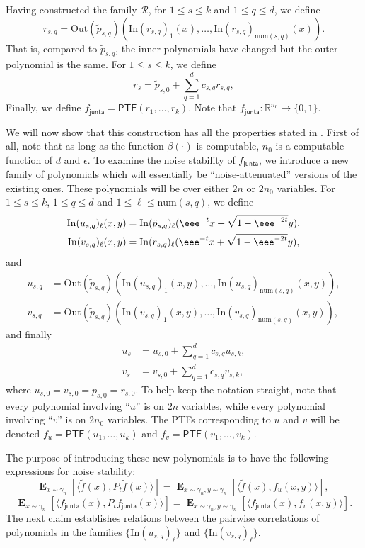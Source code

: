\documentclass{toc}
\newcommand{\Inner}{\mathrm{In}}
\newcommand{\Outer}{\mathrm{Out}}
\newcommand{\num}{\mathrm{num}}
\newcommand{\fh}{{f_{\mathsf{junta}}}}
\begin{document}
Having constructed the family $\mathcal{R}$, for $1 \le s \le k$ and $1 \le q \le d$, we define
\[
r_{s,q} =\Outer(\tilde p_{s,q}) \left(\Inner(r_{s,q})_1(x),\dots, \Inner(r_{s,q})_{\num({s,q})}(x)\right).
\]
That is, compared to $\tilde p_{s,q}$, the inner polynomials have changed but the outer polynomial is the same.
For $1 \le s \le k$, we define
\[
    r_s =  \tilde p_{s,0} + \sum_{q=1}^d c_{s,q} r_{s,q},
\]
Finally, we define $\fh = \mathsf{PTF}({r}_1, \ldots, {r}_k)$. Note that $\fh: \mathbb{R}^{n_0} \rightarrow \{0,1\}$.

We will now show that this construction has all the properties stated in . 
First of all, note that as long as the function $\beta(\cdot)$ is computable, $n_0$ is a computable function of $d$ and $\epsilon$.
To examine the noise stability of $\fh$, we introduce
a new family of polynomials which will essentially be
``noise-attenuated'' versions of the existing ones. These polynomials will be over
either $2n$ or $2n_0$ variables.
For $1 \le s \le k$, $1 \le q \le d$ and $1 \le \ell \le \num(s,q)$, we define 
\begin{align*}
    \Inner(u_{s,q})_\ell(x,y) &= \Inner(\tilde p_{s,q})_\ell(\eee^{-t}x + \sqrt{1 - \eee^{-2t}}y), \\
    \Inner(v_{s,q})_\ell(x,y) &= \Inner(r_{s,q})_\ell(\eee^{-t}x + \sqrt{1 - \eee^{-2t}}y),
\end{align*}
and
\begin{align*}
    u_{s,q} &= \Outer(\tilde p_{s,q}) \left(\Inner(u_{s,q})_1(x,y),\dots, \Inner(u_{s,q})_{\num({s,q})}(x,y)\right), \\
    v_{s,q} &=\Outer(\tilde p_{s,q}) \left(\Inner(v_{s,q})_1(x,y),\dots, \Inner(v_{s,q})_{\num({s,q})}(x,y)\right),
\end{align*}
and finally
\begin{align*}
    u_s &= u_{s,0} + \sum_{q=1}^d c_{s,q} u_{s,k}, \\
    v_s &= v_{s,0} + \sum_{q=1}^d c_{s,q} v_{s,k},
\end{align*}
where $u_{s,0} = v_{s,0} = p_{s,0}= r_{s,0}$.
To help keep the notation straight, note that every polynomial involving
``$u$'' is on $2n$ variables, while every polynomial involving ``$v$'' is on $2
n_0$ variables. The PTFs corresponding to $u$ and $v$ will be denoted
$f_u = \mathsf{PTF}(u_1,\dots, u_k)$ and $f_v = \mathsf{PTF}(v_1, \dots, v_k)$.

The purpose of introducing these new polynomials is to have the following expressions
for noise stability:
$$
\mathop{\mathbf{E}}_{x \sim \gamma_n} [\langle \tilde{f}(x) , P_{t} \tilde{f}(x) \rangle] = \mathop{\mathbf{E}}_{x \sim \gamma_n, y \sim \gamma_n}[\langle \tilde{f}(x), f_u(x,y) \rangle], \ 
$$ 
$$
\mathop{\mathbf{E}}_{x \sim \gamma_n} [\langle \fh(x) , P_{t} \fh(x)\rangle] = \mathop{\mathbf{E}}_{x \sim \gamma_n, y \sim \gamma_n}[\langle \fh(x), f_v(x,y) \rangle].
$$
The next claim establishes relations between the pairwise correlations of polynomials in the families
$\{\Inner(u_{s,q})_\ell\}$ and $\{\Inner(v_{s,q})_\ell\}$. 
\end{document}
